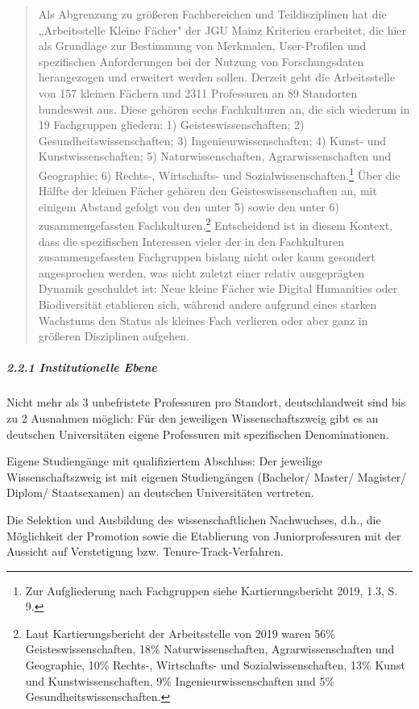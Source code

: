 \begin{quote}
Als Abgrenzung zu größeren Fachbereichen und Teildisziplinen hat die
„Arbeitsstelle Kleine Fächer" der JGU Mainz Kriterien erarbeitet, die
hier als Grundlage zur Bestimmung von Merkmalen, User-Profilen und
spezifischen Anforderungen bei der Nutzung von Forschungsdaten
herangezogen und erweitert werden sollen. Derzeit geht die Arbeitsstelle
von 157 kleinen Fächern und 2311 Professuren an 89 Standorten bundesweit
aus. Diese gehören sechs Fachkulturen an, die sich wiederum in 19
Fachgruppen gliedern: 1) Geisteswissenschaften; 2)
Gesundheitswissenschaften; 3) Ingenieurwissenschaften; 4) Kunst- und
Kunstwissenschaften; 5) Naturwissenschaften, Agrarwissenschaften und
Geographie; 6) Rechts-, Wirtschafts- und
Sozialwissenschaften.\footnote{Zur Aufgliederung nach Fachgruppen siehe
  Kartierungsbericht 2019, 1.3, S. 9.} Über die Hälfte der kleinen
Fächer gehören den Geisteswissenschaften an, mit einigem Abstand gefolgt
von den unter 5) sowie den unter 6) zusammengefassten
Fachkulturen.\footnote{Laut Kartierungsbericht der Arbeitsstelle von
  2019 waren 56\% Geisteswissenschaften, 18\% Naturwissenschaften,
  Agrarwissenschaften und Geographie, 10\% Rechts-, Wirtschafts- und
  Sozialwissenschaften, 13\% Kunst und Kunstwissenschaften, 9\%
  Ingenieurwissenschaften und 5\% Gesundheitswissenschaften.}
Entscheidend ist in diesem Kontext, dass die spezifischen Interessen
vieler der in den Fachkulturen zusammengefassten Fachgruppen bislang
nicht oder kaum gesondert angesprochen werden, was nicht zuletzt einer
relativ ausgeprägten Dynamik geschuldet ist: Neue kleine Fächer wie
Digital Humanities oder Biodiversität etablieren sich, während andere
aufgrund eines starken Wachstums den Status als kleines Fach verlieren
oder aber ganz in größeren Disziplinen aufgehen.
\end{quote}

\hypertarget{institutionelle-ebene-1}{%
\subparagraph{2.2.1 Institutionelle
Ebene}\label{institutionelle-ebene-1}}

Nicht mehr als 3 unbefristete Professuren pro Standort, deutschlandweit
sind bis zu 2 Ausnahmen möglich: Für den jeweiligen Wissenschaftszweig
gibt es an deutschen Universitäten eigene Professuren mit spezifischen
Denominationen.

Eigene Studiengänge mit qualifiziertem Abschluss: Der jeweilige
Wissenschaftszweig ist mit eigenen Studiengängen (Bachelor/ Master/
Magister/ Diplom/ Staatsexamen) an deutschen Universitäten vertreten.

Die Selektion und Ausbildung des wissenschaftlichen Nachwuchses, d.h.,
die Möglichkeit der Promotion sowie die Etablierung von
Juniorprofessuren mit der Aussicht auf Verstetigung bzw.
Tenure-Track-Verfahren.

